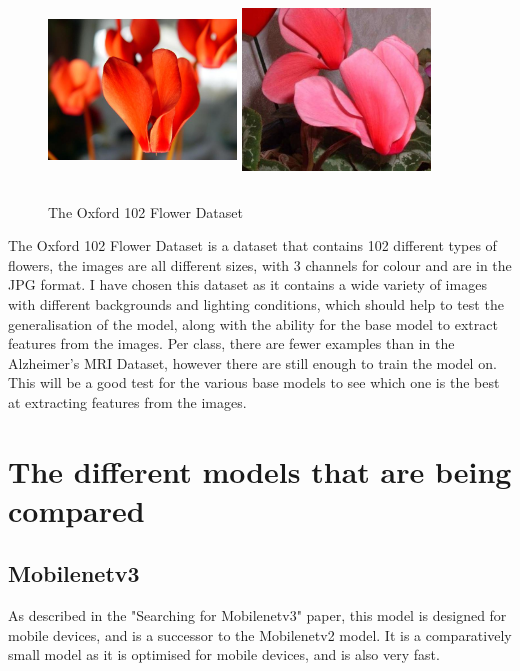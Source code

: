 \documentclass[]{final_report}
\begin{document}
\begin{figure}[ht!]
  \centering
  \includegraphics[width=50mm,height=50mm]{images/flower1.jpg}
  \includegraphics[width=50mm,height=50mm]{images/flower2.jpg}
  \caption{The Oxford 102 Flower Dataset\cite{OxfordFlowers102}}
\end{figure}

The Oxford 102 Flower Dataset is a dataset that contains 102 different types of flowers,
the images are all different sizes, with 3 channels for colour and are in the JPG format.
I have chosen this dataset as it contains a wide variety of images with different backgrounds and lighting conditions,
which should help to test the generalisation of the model, along with the ability for the base model to extract features from the images.
Per class, there are fewer examples than in the Alzheimer's MRI Dataset, however there are still enough to train the model on.
This will be a good test for the various base models to see which one is the best at extracting features from the images.

\chapter{The different models that are being compared}
\section{Mobilenetv3}

As described in the "Searching for Mobilenetv3" paper\cite{DBLP:journals/corr/abs-1905-02244}, this model is designed for mobile devices, and is a successor to the Mobilenetv2 model.
It is a comparatively small model as it is optimised for mobile devices, and is also very fast.
\end{document}
